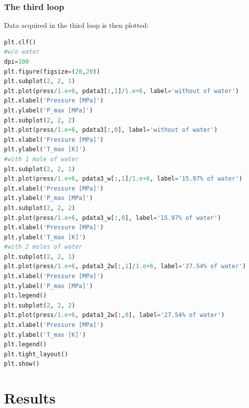 \documentclass[a4paper]{article}
\begin{document}
\subsubsection{The third loop}
Data acquired in the third loop is then plotted:
\begin{lstlisting}[language=python]
plt.clf()
#w/o water
dpi=100
plt.figure(figsize=(20,20))
plt.subplot(2, 2, 1)
plt.plot(press/1.e+6, pdata3[:,1]/1.e+6, label='without of water')
plt.xlabel('Pressure [MPa]')
plt.ylabel('P_max [MPa]')
plt.subplot(2, 2, 2)
plt.plot(press/1.e+6, pdata3[:,0], label='without of water')
plt.xlabel('Pressure [MPa]')
plt.ylabel('T_max [K]')
#with 1 mole of water
plt.subplot(2, 2, 1)
plt.plot(press/1.e+6, pdata3_w[:,1]/1.e+6, label='15.97% of water')
plt.xlabel('Pressure [MPa]')
plt.ylabel('P_max [MPa]')
plt.subplot(2, 2, 2)
plt.plot(press/1.e+6, pdata3_w[:,0], label='15.97% of water')
plt.xlabel('Pressure [MPa]')
plt.ylabel('T_max [K]')
#with 2 moles of water
plt.subplot(2, 2, 1)
plt.plot(press/1.e+6, pdata3_2w[:,1]/1.e+6, label='27.54% of water')
plt.xlabel('Pressure [MPa]')
plt.ylabel('P_max [MPa]')
plt.legend()
plt.subplot(2, 2, 2)
plt.plot(press/1.e+6, pdata3_2w[:,0], label='27.54% of water')
plt.xlabel('Pressure [MPa]')
plt.ylabel('T_max [K]')
plt.legend()
plt.tight_layout()
plt.show()       
\end{lstlisting}

\section{Results}
\end{document}
